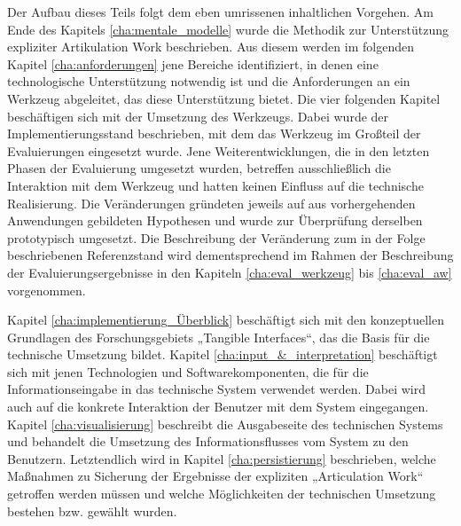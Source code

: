Der Aufbau dieses Teils folgt dem eben umrissenen inhaltlichen Vorgehen. Am Ende des Kapitels \ref{cha:mentale_modelle} wurde die Methodik zur Unterstützung expliziter Artikulation Work beschrieben. Aus diesem werden im folgenden Kapitel \ref{cha:anforderungen} jene Bereiche identifiziert, in denen eine technologische Unterstützung notwendig ist und die Anforderungen an ein Werkzeug abgeleitet, das diese Unterstützung bietet. Die vier folgenden Kapitel beschäftigen sich mit der Umsetzung des Werkzeugs. Dabei wurde der Implementierungsstand beschrieben, mit dem das Werkzeug im Großteil der Evaluierungen eingesetzt wurde. Jene Weiterentwicklungen, die in den letzten Phasen der Evaluierung umgesetzt wurden, betreffen ausschließlich die Interaktion mit dem Werkzeug und hatten keinen Einfluss auf die technische Realisierung. Die Veränderungen gründeten jeweils auf aus vorhergehenden Anwendungen gebildeten Hypothesen und wurde zur Überprüfung derselben prototypisch umgesetzt. Die Beschreibung der Veränderung zum in der Folge beschriebenen Referenzstand wird dementsprechend im Rahmen der Beschreibung der Evaluierungsergebnisse in den Kapiteln \ref{cha:eval_werkzeug} bis \ref{cha:eval_aw} vorgenommen.

Kapitel \ref{cha:implementierung_Überblick} beschäftigt sich mit den konzeptuellen Grundlagen des Forschungsgebiets „Tangible Interfaces“, das die Basis für die technische Umsetzung bildet. Kapitel \ref{cha:input_&_interpretation} beschäftigt sich mit jenen Technologien und Softwarekomponenten, die für die Informationseingabe in das technische System verwendet werden. Dabei wird auch auf die konkrete Interaktion der Benutzer mit dem System eingegangen. Kapitel \ref{cha:visualisierung} beschreibt die Ausgabeseite des technischen Systems und behandelt die Umsetzung des Informationsflusses vom System zu den Benutzern. Letztendlich wird in Kapitel \ref{cha:persistierung} beschrieben, welche Maßnahmen zu Sicherung der Ergebnisse der expliziten „Articulation Work“ getroffen werden müssen und welche Möglichkeiten der technischen Umsetzung bestehen bzw. gewählt wurden.











